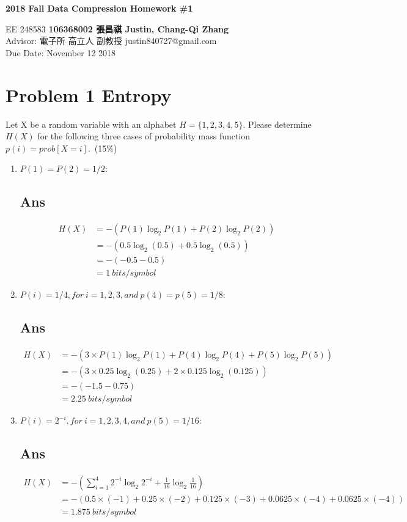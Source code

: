 \documentclass[a4paper, 11pt]{article}
\begin{document}
\noindent
\begin{center}
  \large\textbf{2018 Fall Data Compression Homework \#1} \\
\end{center}
\begin{CJK}{UTF8}{bsmi}
\normalsize EE 248583 \hfill \textbf{106368002 張昌祺 Justin, Chang-Qi Zhang} \\
Advisor: 電子所 高立人 副教授 \hfill justin840727@gmail.com \\
\null\hfill Due Date: November 12 2018 \\
\end{CJK}

\section*{Problem 1 Entropy}
Let X be a random variable with an alphabet $H=\{1, 2, 3, 4, 5\}$. Please determine 
$H(X)$ for the following three cases of probability mass function $p(i)=prob[X=i]$.~(15\%)
\begin{enumerate}[label=(\alph*)]
  \item $P(1)=P(2)=1/2$:
    \subsection*{Ans}
    \begin{align*}
      H(X)&=-(P(1)\log_{2}P(1)+P(2)\log_{2}P(2)) \\
          &=-(0.5\log_{2}(0.5)+0.5\log_{2}(0.5)) \\
          &=-(-0.5-0.5)  \\
          &=1 ~bits/symbol
    \end{align*}
    \label{p:1-a}
  \item $P(i)=1/4, for~i = 1, 2, 3,and~p(4) = p(5) = 1/8$:
    \subsection*{Ans}
    \begin{align*}
      H(X)&=-(3\times P(1)\log_{2}P(1)+P(4)\log_{2}P(4)+P(5)\log_{2}P(5)) \\
          &=-(3\times 0.25\log_{2}(0.25)+2\times 0.125\log_{2}(0.125)) \\
          &=-(-1.5-0.75)  \\
          &=2.25 ~bits/symbol
    \end{align*}
    \label{p:1-b}
  \item $P(i)=2^{-i}, for~i = 1, 2, 3, 4,and~p(5) =  1/16$:
    \subsection*{Ans}
    \begin{align*}
      H(X)&=-(\sum_{i=1}^{4} 2^{-i}\log_{2}2^{-i}+\frac{1}{16}\log_{2}\frac{1}{16}) \\
          &=-(0.5\times(-1)+0.25\times(-2)+0.125\times(-3)+0.0625\times(-4)
            +0.0625\times(-4)) \\
          &=1.875 ~bits/symbol
    \end{align*}
    \label{p:1-c}
\end{enumerate}
\newpage
\end{document}
